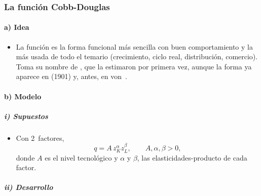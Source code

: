 \documentclass[11pt]{article}
\begin{document}
\subsubsection{La función Cobb-Douglas}\label{sec:funcion-cobb-douglas}

\paragraph{a) Idea}

\begin{itemize}
\item La función  es la forma funcional más sencilla con buen comportamiento y la más usada de todo el temario (crecimiento, ciclo real, distribución, comercio). Toma su nombre de \textcite{CobbDouglas1928Theory}, que la estimaron por primera vez, aunque la forma ya aparece en  (1901) y, antes, en von~\nocite{Sandelin1976Origin,Humphrey1997Algebraic}.
\end{itemize}

\paragraph{b) Modelo}

\subparagraph{i) Supuestos}

\begin{itemize}
\item Con 2~factores,
  \begin{equation}
  q=A\,z_K^{\alpha}z_L^{\beta},\qquad A,\alpha,\beta>0, \label{eq:cobb-douglas}
  \end{equation}
  donde $A$ es el nivel tecnológico y $\alpha$ y $\beta$, las elasticidades-producto de cada factor.
\end{itemize}

\subparagraph{ii) Desarrollo}
\end{document}
